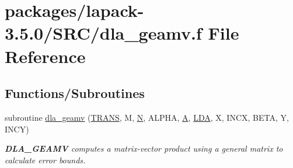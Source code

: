 \hypertarget{dla__geamv_8f}{}\section{packages/lapack-\/3.5.0/\+S\+R\+C/dla\+\_\+geamv.f File Reference}
\label{dla__geamv_8f}
\subsection*{Functions/\+Subroutines}
\begin{DoxyCompactItemize}
\item 
subroutine \hyperlink{group__doubleGEcomputational_gac150eadbadeb706cda2998e2bb0a70dd}{dla\+\_\+geamv} (\hyperlink{superlu__enum__consts_8h_a0c4e17b2d5cea33f9991ccc6a6678d62a1f61e3015bfe0f0c2c3fda4c5a0cdf58}{T\+R\+A\+N\+S}, M, \hyperlink{polmisc_8c_a0240ac851181b84ac374872dc5434ee4}{N}, A\+L\+P\+H\+A, \hyperlink{classA}{A}, \hyperlink{example__user_8c_ae946da542ce0db94dced19b2ecefd1aa}{L\+D\+A}, X, I\+N\+C\+X, B\+E\+T\+A, Y, I\+N\+C\+Y)
\begin{DoxyCompactList}\small\item\em {\bfseries D\+L\+A\+\_\+\+G\+E\+A\+M\+V} computes a matrix-\/vector product using a general matrix to calculate error bounds. \end{DoxyCompactList}\end{DoxyCompactItemize}
